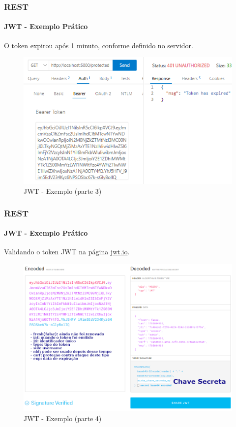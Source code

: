 \documentclass[
	9pt, %
	t, %
]{beamer}
\begin{document}
\begin{frame}
	\frametitle{REST}
	\framesubtitle{JWT - Exemplo Prático}

	\centering
	O token expirou após 1 minuto, conforme definido no servidor.

	\begin{figure}
		\includegraphics[width=0.9\linewidth]{jwt-3.png}
		\caption{JWT - Exemplo (parte 3)}
		\label{fig:jwt_example3}
	\end{figure}

\end{frame}

\begin{frame}
	\frametitle{REST}
	\framesubtitle{JWT - Exemplo Prático}

	\centering
	Validando o token JWT na página \href{https://jwt.io/}{jwt.io}.

	\begin{figure}
		\includegraphics[width=0.75\linewidth]{jwt-4.png}
		\caption{JWT - Exemplo (parte 4)}
		\label{fig:jwt_example4}
	\end{figure}

\end{frame}
\end{document}
